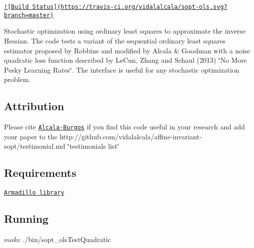 \href{https://travis-ci.org/vidalalcala/sopt-ols}{\tt !\mbox{[}Build Status\mbox{]}(https\-://travis-\/ci.\-org/vidalalcala/sopt-\/ols.\-svg?branch=master)}

Stochastic optimization using ordinary least squares to approximate the inverse Hessian. The code tests a variant of the sequential ordinary least squares estimator proposed by Robbins and modified by Alcala \& Goodman with a noise quadratic loss function described by Le\-Cun, Zhang and Schaul (2013) \char`\"{}\-No More Pesky Learning Rates\char`\"{}. The interface is useful for any stochastic optimization problem.

\subsection*{Attribution }

Please cite \href{http://gradworks.umi.com/35/24/3524127.html}{\tt Alcala-\/\-Burgos} if you find this code useful in your research and add your paper to the http\-://github.com/vidalalcala/affine-\/invariant-\/sopt/testimonial.\-md \char`\"{}testimonials list\char`\"{}

\subsection*{Requirements }


\begin{DoxyItemize}
\item \href{http://arma.sourceforge.net/}{\tt Armadillo library}
\end{DoxyItemize}

\subsection*{Running }

\begin{DoxyVerb}$ make
$ ./bin/sopt_olsTestQuadratic\end{DoxyVerb}
 